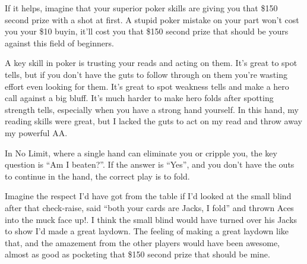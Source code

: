 If it helps, imagine that your superior poker skills are giving 
you that \$150 second prize with a shot at first. A stupid poker 
mistake on your part won't cost you your \$10 buyin, it'll cost 
you that \$150 second prize that should be yours against this 
field of beginners.

A key skill in poker is trusting your reads and acting on them. 
It's great to spot tells, but if you don't have the guts to follow 
through on them you're wasting effort even looking for them. It's 
great to spot weakness tells and make a hero call against a big bluff. 
It's much harder to make hero folds after spotting strength tells, 
especially when you have a strong hand yourself.
In this hand, my reading skills were great, but I lacked the guts to act
on my read and throw away my powerful AA.

In No Limit, where a single hand can eliminate you or cripple you, the key
question is ``Am I beaten?''. If the answer is ``Yes'', and you don't have
the outs to continue in the hand, the correct play is to fold.

Imagine the respect I'd have got from the table if I'd looked at the 
small blind after that check-raise, said ``both your cards are 
Jacks, I fold'' and thrown Aces into the muck face up!. I think the 
small blind would have turned over his Jacks to show I'd made a great 
laydown. The feeling of making a great laydown like that,
and the amazement from the other players would have been awesome, almost as
good as pocketing that \$150 second prize that should be mine.

